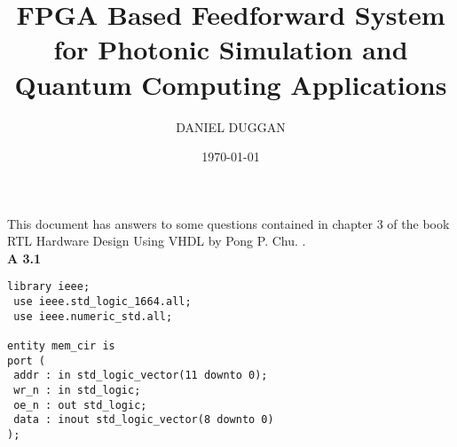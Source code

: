 \documentclass{article}
\title{FPGA Based Feedforward System for Photonic Simulation and Quantum Computing Applications}
\author{\uppercase{Daniel Duggan}}
\date{\today}   %
\begin{document}
\maketitle    %




This document has answers to some questions contained in chapter 3 of the book RTL Hardware Design Using VHDL 
by Pong P. Chu. \cite{chu2006rtl}.  \\

\textbf{A 3.1} \\

\begin{lstlisting}[style=vhdlstyle]
 library ieee;
 use ieee.std_logic_1664.all;
 use ieee.numeric_std.all; 

entity mem_cir is 
port (
 addr : in std_logic_vector(11 downto 0); 
 wr_n : in std_logic; 
 oe_n : out std_logic; 
 data : inout std_logic_vector(8 downto 0) 
);
\end{lstlisting}



\end{document}
